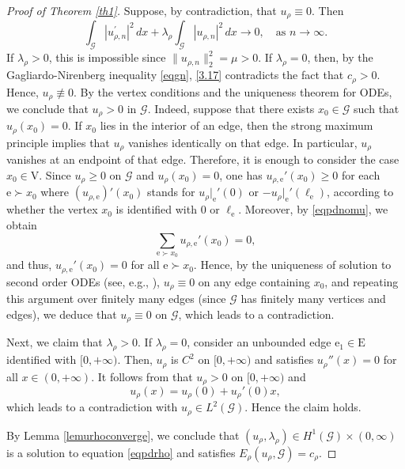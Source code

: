 \documentclass[11pt]{amsart}
\newcommand{\G}{\mathcal{G}}
\newcommand{\E}{\mathrm{E}}
\newcommand{\V}{\mathrm{V}}
\newcommand{\e}{\mathrm{e}}
\numberwithin{equation}{section}
\begin{document}
\begin{proof}[Proof of Theorem \ref{th1}]
Suppose, by contradiction, that $u_{\rho}\equiv 0$. Then
\begin{equation}\label{3.17}
\int_{\mathcal{G}}|u_{\rho,n}^{\prime}|^{2}\,dx+\lambda_{\rho}\int_{\mathcal{G}}|u_{\rho,n}|^{2}\,dx\to 0,\quad \text{as }n \to \infty.
\end{equation}
If $\lambda_{\rho}>0$, this is impossible since $\|u_{\rho,n}\|^{2}_2=\mu>0$. If $\lambda_{\rho}=0$, then, by the Gagliardo-Nirenberg inequality \eqref{eqgn}, \eqref{3.17} contradicts the fact that  $c_{\rho}>0$. Hence, $u_{\rho}\not\equiv 0$.
By the vertex conditions and the uniqueness theorem for ODEs, we conclude that $u_{\rho}>0$ in $\mathcal{G}$. Indeed, suppose that there exists $x_0\in\G$ such that $u_\rho(x_0)=0$. If $x_0$ lies in the interior of an edge, then the strong
maximum principle implies that $u_\rho$ vanishes identically on that edge.
In particular, $u_\rho$ vanishes at an endpoint of that edge. Therefore, it
is enough to consider the case $x_0\in\V$. Since $u_\rho\geq0$ on $\G$ and $u_\rho(x_0)=0$, one has $u_{\rho,\e}'(x_0)\geq0$ for each $ \e\succ x_0$
where $(u_{\rho,\e})'(x_0)$ stands for $u_{\rho}|_\e'(0)$ or $-u_{\rho}|_\e'(\ell_\e)$, according to whether the vertex $x_0$ is identified with $0$ or $\ell_\e$. Moreover, by \eqref{eqpdnomu}, we obtain
 $$\sum_{\e\succ x_0}u_{\rho,\e}'(x_0)=0,
 $$
 and thus, $u_{\rho,\e}'(x_0)=0$ for all $\e \succ x_0$. Hence, by the uniqueness of solution to second order ODEs (see, e.g., {\cite[Theorem 10 in Section 3.1]{AD}}), $u_\rho \equiv 0$ on any edge containing $x_0$, and repeating this argument over finitely many edges (since $\mathcal{G}$ has finitely many vertices and edges), we deduce that $u_{\rho}\equiv 0$ on $\mathcal{G}$, which leads to a contradiction.


Next, we claim that $\lambda_\rho > 0$. If $\lambda_\rho = 0$, consider an unbounded edge $\e_1 \in \E$ identified with $[0, +\infty)$. Then,  $u_\rho$ is $C^2$ on $[0, +\infty)$ and satisfies $u_\rho''(x) = 0$ for all $x \in (0, +\infty)$. It follows from \cite[Remark 4 in Section 3.3]{AD} that $u_\rho > 0$ on $[0, +\infty)$ and
\[
u_\rho(x) = u_\rho(0) + u_\rho'(0)x,
\]
which leads to a contradiction with $u_\rho \in L^2(\mathcal{G})$. Hence the claim holds. 

By Lemma \ref{lemurhoconverge}, we conclude that $(u_\rho,\lambda_\rho) \in H^1(\G)\times (0,\infty)$ is a solution to equation \eqref{eqpdrho} and satisfies $E_{\rho}(u_{\rho},\G)=c_{\rho}$.


\end{proof}
\end{document}
